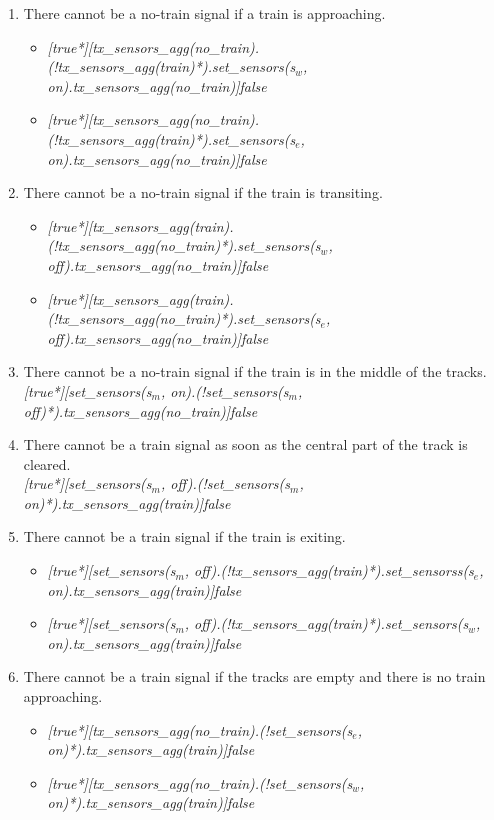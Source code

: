 \documentclass[final]{report}
\begin{document}
\begin{enumerate}
\item There cannot be a no-train signal if a train is approaching.
\begin{itemize}
\item \textit{[true*][tx\_sensors\_agg(no\_train).(!tx\_sensors\_agg(train)*).set\_sensors(s$_{w}$, on).tx\_sensors\_agg(no\_train)]false}
\item \textit{[true*][tx\_sensors\_agg(no\_train).(!tx\_sensors\_agg(train)*).set\_sensors(s$_{e}$, on).tx\_sensors\_agg(no\_train)]false} 
\end{itemize}

\item There cannot be a no-train signal if the train is transiting.
\begin{itemize}
\item \textit{[true*][tx\_sensors\_agg(train).(!tx\_sensors\_agg(no\_train)*).set\_sensors(s$_{w}$, off).tx\_sensors\_agg(no\_train)]false}
\item \textit{[true*][tx\_sensors\_agg(train).(!tx\_sensors\_agg(no\_train)*).set\_sensors(s$_{e}$, off).tx\_sensors\_agg(no\_train)]false}
\end{itemize}

\item There cannot be a no-train signal if the train is in the middle of the tracks.\\
\textit{[true*][set\_sensors(s$_{m}$, on).(!set\_sensors(s$_{m}$, off)*).tx\_sensors\_agg(no\_train)]false}

\item There cannot be a train signal as soon as the central part of the track is cleared.\\
\textit{[true*][set\_sensors(s$_{m}$, off).(!set\_sensors(s$_{m}$, on)*).tx\_sensors\_agg(train)]false
}

\item There cannot be a train signal if the train is exiting.
\begin{itemize}
\item \textit{[true*][set\_sensors(s$_{m}$, off).(!tx\_sensors\_agg(train)*).set\_sensorss(s$_{e}$, on).tx\_sensors\_agg(train)]false}
\item \textit{[true*][set\_sensors(s$_{m}$, off).(!tx\_sensors\_agg(train)*).set\_sensors(s$_{w}$, on).tx\_sensors\_agg(train)]false}
\end{itemize}

\item There cannot be a train signal if the tracks are empty and there is no train approaching.
\begin{itemize}
\item \textit{[true*][tx\_sensors\_agg(no\_train).(!set\_sensors(s$_{e}$, on)*).tx\_sensors\_agg(train)]false}
\item \textit{[true*][tx\_sensors\_agg(no\_train).(!set\_sensors(s$_{w}$, on)*).tx\_sensors\_agg(train)]false}
\end{itemize}

\end{enumerate}
\end{document}
